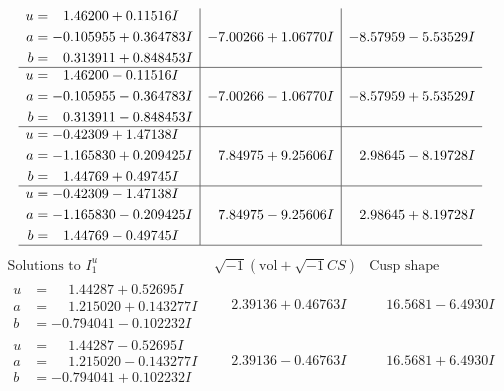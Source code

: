 \documentclass[1p]{elsarticle_modified}
\theoremstyle{definition}
\newcommand{\I}{\sqrt{-1}}
\begin{document}
$$\begin{array}{c|c|c}
\begin{aligned}
u &= \phantom{-}1.46200 + 0.11516 I \\
a &= -0.105955 + 0.364783 I \\
b &= \phantom{-}0.313911 + 0.848453 I\end{aligned}
 & -7.00266 + 1.06770 I & -8.57959 - 5.53529 I \\ \hline\begin{aligned}
u &= \phantom{-}1.46200 - 0.11516 I \\
a &= -0.105955 - 0.364783 I \\
b &= \phantom{-}0.313911 - 0.848453 I\end{aligned}
 & -7.00266 - 1.06770 I & -8.57959 + 5.53529 I \\ \hline\begin{aligned}
u &= -0.42309 + 1.47138 I \\
a &= -1.165830 + 0.209425 I \\
b &= \phantom{-}1.44769 + 0.49745 I\end{aligned}
 & \phantom{-}7.84975 + 9.25606 I & \phantom{-}2.98645 - 8.19728 I \\ \hline\begin{aligned}
u &= -0.42309 - 1.47138 I \\
a &= -1.165830 - 0.209425 I \\
b &= \phantom{-}1.44769 - 0.49745 I\end{aligned}
 & \phantom{-}7.84975 - 9.25606 I & \phantom{-}2.98645 + 8.19728 I\\
 \hline 
 \end{array}$$\newpage$$\begin{array}{c|c|c}  
\text{Solutions to }I^u_{1}& \I (\text{vol} + \sqrt{-1}CS) & \text{Cusp shape}\\
 \hline 
\begin{aligned}
u &= \phantom{-}1.44287 + 0.52695 I \\
a &= \phantom{-}1.215020 + 0.143277 I \\
b &= -0.794041 - 0.102232 I\end{aligned}
 & \phantom{-}2.39136 + 0.46763 I & \phantom{-}16.5681 - 6.4930 I \\ \hline\begin{aligned}
u &= \phantom{-}1.44287 - 0.52695 I \\
a &= \phantom{-}1.215020 - 0.143277 I \\
b &= -0.794041 + 0.102232 I\end{aligned}
 & \phantom{-}2.39136 - 0.46763 I & \phantom{-}16.5681 + 6.4930 I \\ \hline\begin{aligned}

\end{aligned}
\end{array}$$
\end{document}
